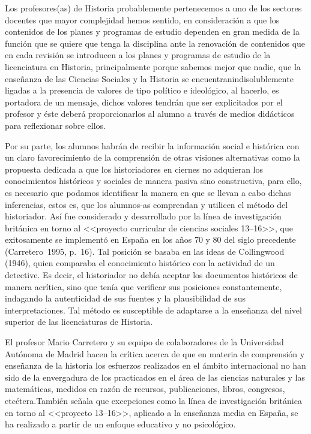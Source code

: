 Los profesores(as) de Historia probablemente pertenecemos a uno de los 
sectores docentes que mayor complejidad hemos sentido, en consideración 
a que los contenidos de los planes y programas de estudio dependen en 
gran medida de la función que se quiere que tenga la disciplina ante la 
renovación de contenidos que en cada revisión se introducen a los 
planes y programas de estudio de la licenciatura en Historia, 
principalmente porque sabemos mejor que nadie, que la enseñanza de las 
Ciencias Sociales y la Historia se encuentran\linebreak indisolublemente ligadas 
a la presencia de valores de tipo político e ideológico, al hacerlo, es 
portadora de un mensaje, dichos valores tendrán que ser explicitados 
por el profesor y éste deberá proporcionarlos al alumno a través de 
medios didácticos para reflexionar sobre ellos. 

 
Por su parte, los alumnos habrán de recibir la información social e 
histórica con un claro favorecimiento de la comprensión de otras 
visiones alternativas como la propuesta dedicada a que los 
historiadores en \mbox{ciernes} no adquieran los conocimientos históricos y 
sociales de manera pasiva sino constructiva, para ello, es necesario 
que podamos identificar la manera en que se llevan a cabo dichas 
inferencias, estos es, que los alumnos-as comprendan y utilicen el 
método del historiador. Así fue considerado y desarrollado por la línea 
de investigación británica en torno al <<proyecto curricular de ciencias 
sociales 13--16>>, que exitosamente se implementó en España en los años 70 y 80 del siglo precedente (Carretero~1995, p.~16). Tal 
posición se basaba en las ideas de Collingwood (1946), quien comparaba 
el conocimiento histórico con la actividad de un detective. Es decir, 
el historiador no debía aceptar los documentos históricos de manera 
acrítica, sino que tenía que verificar sus posiciones constantemente, 
indagando la autenticidad de sus fuentes y la plausibilidad de sus 
interpretaciones. Tal método es susceptible de adaptarse a la enseñanza 
del nivel superior de las licenciaturas de Historia.

\enlargethispage{1\baselineskip} 
El profesor Mario Carretero y su equipo de colaboradores de la 
Universidad Autónoma de Madrid hacen la crítica acerca de que en 
materia de comprensión y enseñanza de la historia los esfuerzos 
realizados en el ámbito internacional no han sido de la envergadura de 
los practicados en el área de las ciencias naturales y las matemáticas, 
medidos en razón de recursos, publicaciones, libros, congresos, 
etcétera.\linebreak También señala que excepciones como la línea de investigación 
británica en torno al <<proyecto 13--16>>, aplicado a la enseñanza media 
en España, se ha realizado a partir de un enfoque educativo y no 
psicológico. 

